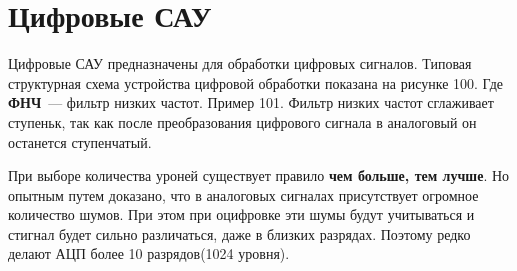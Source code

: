 \section{Цифровые САУ}
Цифровые САУ предназначены для обработки цифровых сигналов. Типовая структурная схема устройства цифровой обработки показана на рисунке 100. Где \textbf{ФНЧ}~--- фильтр низких частот. Пример 101. Фильтр низких частот сглаживает ступеньк, так как после преобразования цифрового сигнала в аналоговый он останется ступенчатый.

При выборе количества уроней существует правило \textbf{чем больше, тем лучше}. Но опытным путем доказано, что в аналоговых сигналах присутствует огромное количество шумов. При этом при оцифровке эти шумы будут учитываться и стигнал будет сильно различаться, даже в близких разрядах. Поэтому редко делают АЦП более 10 разрядов(1024 уровня).


